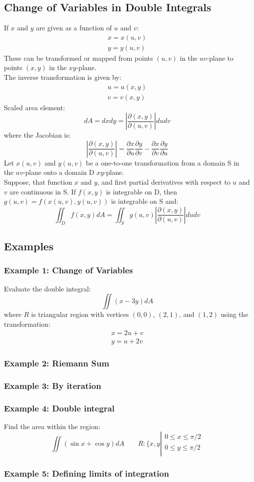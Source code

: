 \subsection{Change of Variables in Double Integrals}
If $x$ and $y$ are given as a function of $u$ and $v$:
$$\begin{array}{c}
x=x(u,v)\\
y=y(u,v)
\end{array}$$
These can be transformed or mapped from points $(u,v)$ in the $uv$-plane to points $(x,y)$ in the $xy$-plane.\\
The inverse transformation is given by:
$$\begin{array}{c}
  u=u(x,y)\\
  v=v(x,y)
\end{array}$$
Scaled area element:
$$dA = dxdy=\left|\frac{\partial(x,y)}{\partial(u,v)}\right|dudv$$
where the Jacobian is:
$$\left|\frac{\partial(x,y)}{\partial(u,v)}\right|=\frac{\partial x}{\partial u}\frac{\partial y}{\partial v}-\frac{\partial x}{\partial v}\frac{\partial y}{\partial u}$$
Let $x(u, v)$ and $y(u,v)$ be a one-to-one transformation from a domain S in the $uv$-plane onto a domain D
$xy$-plane.\\
Suppose, that function $x$ and $y$, and first partial derivatives with respect to $u$ and $v$ are continuous in S.
If $f(x,y)$ is integrable on D, then $g(u,v)=f(x(u,v),y(u,v))$ is integrable on S and:
$$\iint_D f(x,y)dA=\iint_S g(u,v)\left|\frac{\partial(x,y)}{\partial(u,v)}\right|dudv$$

\subsection{Examples}
\subsubsection{Example 1: Change of Variables}
Evaluate the double integral:
$$\iint (x-3y)dA$$
where $R$ is triangular region with vertices $(0,0)$, $(2,1)$, and $(1,2)$ using the transformation:
$$\begin{array}{c}
  x=2u+v\\
  y=u+2v
\end{array}$$

\subsubsection{Example 2: Riemann Sum}
\subsubsection{Example 3: By iteration}
\subsubsection{Example 4: Double integral}
Find the area within the region:
$$\iint(\sin x+\cos y)d A\qquad R: \bigg\{ x,y \left| \begin{array}{c}
 0\leq x\leq \pi/2 \\
 0\leq y\leq \pi/2 \\
\end{array} \right.$$
\subsubsection{Example 5: Defining limits of integration}
